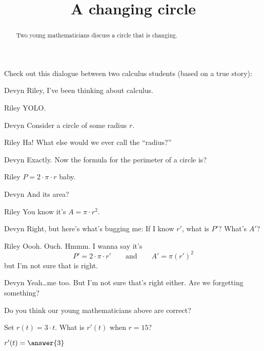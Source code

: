 \documentclass{ximera}
\title[Break-Ground:]{A changing circle}
\begin{document}
\begin{abstract}
Two young mathematicians discuss a circle that is changing.
\end{abstract}
\maketitle

Check out this dialogue between two calculus students (based on a true
story):

\begin{dialogue}
  \item[Devyn] Riley, I've been thinking about calculus.   
  \item[Riley] YOLO.
  \item[Devyn] Consider a circle of some radius $r$.
  \item[Riley] Ha! What else would we ever call the ``radius?''
  \item[Devyn] Exactly. Now the formula for the perimeter of
    a circle is?
  \item[Riley] $P=2\cdot\pi \cdot r$ baby.
  \item[Devyn] And its area?
  \item[Riley] You know it's $A=\pi\cdot r^2$.
  \item[Devyn] Right, but here's what's bugging me: If I know
    $r'$, what is $P'$? What's $A'$?
  \item[Riley] Oooh. Ouch. Hmmm. I wanna say it's
    \[
    P' = 2\cdot\pi \cdot r' \qquad\text{and}\qquad  A' = \pi (r')^2 
    \]
    but I'm not sure that is right.
  \item[Devyn] Yeah\dots me too. But I'm not sure that's
    right either. Are we forgetting something?
\end{dialogue}
  
\begin{problem}
  Do you think our young mathematicians above are correct?
  \begin{multipleChoice}
  \end{multipleChoice}
\end{problem}

\begin{problem}
  Set $r(t)=3\cdot t$. What is $r'(t)$ when $r=15$?
  \begin{prompt}
    $r'(t)=\answer{3}$
  \end{prompt}
\end{problem}
\end{document}
